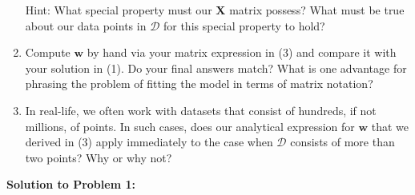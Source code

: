 \documentclass{harvardml}
\theoremstyle{definition}
\theoremstyle{plain}
\begin{document}
\begin{problem}
\begin{enumerate}
    Hint: What special property must our $\mathbf{X}$ matrix possess? What must be true about our data points in $\mathcal{D}$ for this special property to hold?
    \item Compute $\mathbf{w}$ by hand via your matrix expression in (3) and compare it with your solution in (1). Do your final answers match? What is one advantage for phrasing the problem of fitting the model in terms of matrix notation? 
    \item In real-life, we often work with datasets that consist of hundreds, if not millions, of points. In such cases, does our analytical expression for $\mathbf{w}$ that we derived in (3) apply immediately to the case when $\mathcal{D}$ consists of more than two points? Why or why not?
\end{enumerate}
    
\end{problem}
\pagebreak

\noindent \textbf{Solution to Problem 1:}
\end{document}
